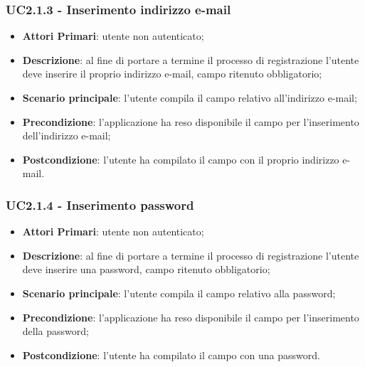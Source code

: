 \subsubsection{UC2.1.3 - Inserimento indirizzo e-mail}
\begin{itemize}
	\item \textbf{Attori Primari}: utente non autenticato;
	\item \textbf{Descrizione}: al fine di portare a termine il processo di registrazione l'utente deve inserire il proprio indirizzo e-mail, campo ritenuto obbligatorio;
	\item \textbf{Scenario principale}: l'utente compila il campo relativo all'indirizzo e-mail;	
	\item \textbf{Precondizione}: l'applicazione ha reso disponibile il campo per l'inserimento dell'indirizzo e-mail;
	\item \textbf{Postcondizione}: l'utente ha compilato il campo con il proprio indirizzo e-mail.
\end{itemize}
\subsubsection{UC2.1.4 - Inserimento password}
\begin{itemize}
	\item \textbf{Attori Primari}: utente non autenticato;
	\item \textbf{Descrizione}: al fine di portare a termine il processo di registrazione l'utente deve inserire una password, campo ritenuto obbligatorio;
	\item \textbf{Scenario principale}: l'utente compila il campo relativo alla password;	
	\item \textbf{Precondizione}: l'applicazione ha reso disponibile il campo per l'inserimento della password;
	\item \textbf{Postcondizione}: l'utente ha compilato il campo con una password.
\end{itemize}
